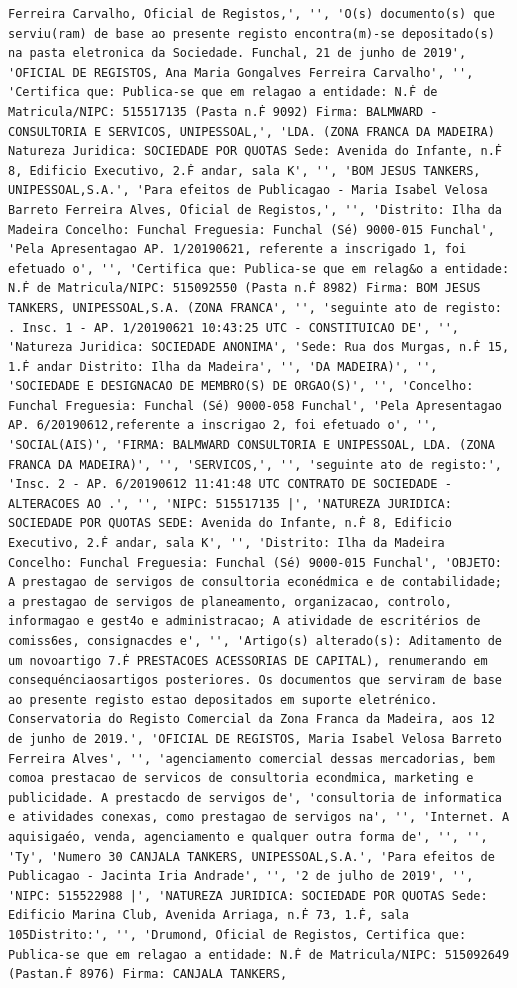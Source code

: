 \documentclass[
  12pt,
]{article}
\begin{document}
\begin{verbatim}
Ferreira Carvalho, Oficial de Registos,', '', 'O(s) documento(s) que serviu(ram) de base ao presente registo encontra(m)-se depositado(s) na pasta eletronica da Sociedade. Funchal, 21 de junho de 2019', 'OFICIAL DE REGISTOS, Ana Maria Gongalves Ferreira Carvalho', '', 'Certifica que: Publica-se que em relagao a entidade: N.Ḟ de Matricula/NIPC: 515517135 (Pasta n.Ḟ 9092) Firma: BALMWARD - CONSULTORIA E SERVICOS, UNIPESSOAL,', 'LDA. (ZONA FRANCA DA MADEIRA) Natureza Juridica: SOCIEDADE POR QUOTAS Sede: Avenida do Infante, n.Ḟ 8, Edificio Executivo, 2.Ḟ andar, sala K', '', 'BOM JESUS TANKERS, UNIPESSOAL,S.A.', 'Para efeitos de Publicagao - Maria Isabel Velosa Barreto Ferreira Alves, Oficial de Registos,', '', 'Distrito: Ilha da Madeira Concelho: Funchal Freguesia: Funchal (Sé) 9000-015 Funchal', 'Pela Apresentagao AP. 1/20190621, referente a inscrigado 1, foi efetuado o', '', 'Certifica que: Publica-se que em relag&o a entidade: N.Ḟ de Matricula/NIPC: 515092550 (Pasta n.Ḟ 8982) Firma: BOM JESUS TANKERS, UNIPESSOAL,S.A. (ZONA FRANCA', '', 'seguinte ato de registo: . Insc. 1 - AP. 1/20190621 10:43:25 UTC - CONSTITUICAO DE', '', 'Natureza Juridica: SOCIEDADE ANONIMA', 'Sede: Rua dos Murgas, n.Ḟ 15, 1.Ḟ andar Distrito: Ilha da Madeira', '', 'DA MADEIRA)', '', 'SOCIEDADE E DESIGNACAO DE MEMBRO(S) DE ORGAO(S)', '', 'Concelho: Funchal Freguesia: Funchal (Sé) 9000-058 Funchal', 'Pela Apresentagao AP. 6/20190612,referente a inscrigao 2, foi efetuado o', '', 'SOCIAL(AIS)', 'FIRMA: BALMWARD CONSULTORIA E UNIPESSOAL, LDA. (ZONA FRANCA DA MADEIRA)', '', 'SERVICOS,', '', 'seguinte ato de registo:', 'Insc. 2 - AP. 6/20190612 11:41:48 UTC CONTRATO DE SOCIEDADE - ALTERACOES AO .', '', 'NIPC: 515517135 |', 'NATUREZA JURIDICA: SOCIEDADE POR QUOTAS SEDE: Avenida do Infante, n.Ḟ 8, Edificio Executivo, 2.Ḟ andar, sala K', '', 'Distrito: Ilha da Madeira Concelho: Funchal Freguesia: Funchal (Sé) 9000-015 Funchal', 'OBJETO: A prestagao de servigos de consultoria econédmica e de contabilidade; a prestagao de servigos de planeamento, organizacao, controlo, informagao e gest4o e administracao; A atividade de escritérios de comiss6es, consignacdes e', '', 'Artigo(s) alterado(s): Aditamento de um novoartigo 7.Ḟ PRESTACOES ACESSORIAS DE CAPITAL), renumerando em consequénciaosartigos posteriores. Os documentos que serviram de base ao presente registo estao depositados em suporte eletrénico. Conservatoria do Registo Comercial da Zona Franca da Madeira, aos 12 de junho de 2019.', 'OFICIAL DE REGISTOS, Maria Isabel Velosa Barreto Ferreira Alves', '', 'agenciamento comercial dessas mercadorias, bem comoa prestacao de servicos de consultoria econdmica, marketing e publicidade. A prestacdo de servigos de', 'consultoria de informatica e atividades conexas, como prestagao de servigos na', '', 'Internet. A aquisigaéo, venda, agenciamento e qualquer outra forma de', '', '', 'Ty', 'Numero 30 CANJALA TANKERS, UNIPESSOAL,S.A.', 'Para efeitos de Publicagao - Jacinta Iria Andrade', '', '2 de julho de 2019', '', 'NIPC: 515522988 |', 'NATUREZA JURIDICA: SOCIEDADE POR QUOTAS Sede: Edificio Marina Club, Avenida Arriaga, n.Ḟ 73, 1.Ḟ, sala 105Distrito:', '', 'Drumond, Oficial de Registos, Certifica que: Publica-se que em relagao a entidade: N.Ḟ de Matricula/NIPC: 515092649 (Pastan.Ḟ 8976) Firma: CANJALA TANKERS, 
\end{verbatim}
\end{document}
